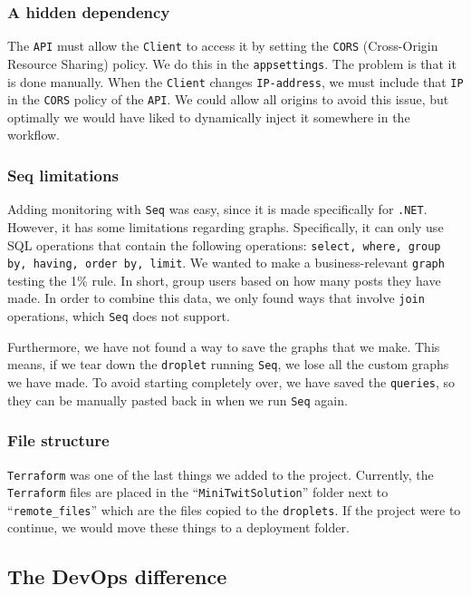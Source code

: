 \subsubsection{A hidden dependency}

The \texttt{API} must allow the \texttt{Client} to access it by 
setting the \texttt{CORS} (Cross-Origin Resource Sharing) policy.
We do this in the \texttt{appsettings}. The problem is that it is done manually.
When the \texttt{Client} changes \texttt{IP-address}, we must include 
that \texttt{IP} in the \texttt{CORS} policy of the \texttt{API}.
We could allow all origins to avoid this issue, 
but optimally we would have liked to dynamically 
inject it somewhere in the workflow.

\subsubsection{Seq limitations}

Adding monitoring with \texttt{Seq} was easy, since it is made specifically for \texttt{.NET}.
However, it has some limitations regarding graphs.
Specifically, it can only use SQL operations that contain the following operations:
\texttt{select, where, group by, having, order by, limit}.
We wanted to make a business-relevant \texttt{graph} testing the 1\% rule\cite{1_perc_rule}.
In short, group users based on how many posts they have made.
In order to combine this data, we only found ways that involve 
\texttt{join} operations, which \texttt{Seq} does not support.

Furthermore, we have not found a way to save the graphs that we make.
This means, if we tear down the \texttt{droplet} running \texttt{Seq},
we lose all the custom graphs we have made.
To avoid starting completely over, we have saved the \texttt{queries},
so they can be manually pasted back in when we run \texttt{Seq} again.

\subsubsection{File structure}

\texttt{Terraform} was one of the last things we added to the project.
Currently, the \texttt{Terraform} files are placed in the ``\texttt{MiniTwitSolution}'' 
folder next to ``\texttt{remote\_files}'' which are the files copied to the \texttt{droplets}.
If the project were to continue, we would move these things to a deployment folder.

\subsection{The DevOps difference}

